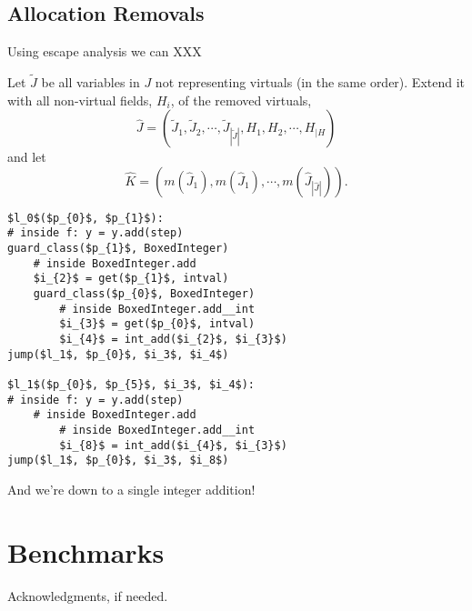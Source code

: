 \documentclass[preprint]{sigplanconf}
\begin{document}
\subsection{Allocation Removals}
Using escape analysis we can XXX

Let $\tilde J$ be all variables in $J$ not representing virtuals (in the
same order). Extend it with all non-virtual fields, $H_i$, of the
removed virtuals,
\begin{equation}
  \hat J = \left(\tilde J_1, \tilde J_2, \cdots, \tilde J_{|\tilde J|}, 
                 H_1, H_2, \cdots, H_{|H}\right)
\end{equation}
and let
\begin{equation}
  \hat K = \left(m\left(\hat J_1\right), m\left(\hat J_1\right), 
                 \cdots, m\left(\hat J_{|\hat J|}\right)\right)
  .
\end{equation}


\begin{lstlisting}[mathescape,numbers = right,basicstyle=\setstretch{1.05}\ttfamily\scriptsize]
$l_0$($p_{0}$, $p_{1}$):
# inside f: y = y.add(step)
guard_class($p_{1}$, BoxedInteger)
    # inside BoxedInteger.add
    $i_{2}$ = get($p_{1}$, intval)
    guard_class($p_{0}$, BoxedInteger)
        # inside BoxedInteger.add__int
        $i_{3}$ = get($p_{0}$, intval)
        $i_{4}$ = int_add($i_{2}$, $i_{3}$)
jump($l_1$, $p_{0}$, $i_3$, $i_4$)

$l_1$($p_{0}$, $p_{5}$, $i_3$, $i_4$):
# inside f: y = y.add(step)
    # inside BoxedInteger.add
        # inside BoxedInteger.add__int
        $i_{8}$ = int_add($i_{4}$, $i_{3}$)
jump($l_1$, $p_{0}$, $i_3$, $i_8$)
\end{lstlisting}

And we're down to a single integer addition!

\section{Benchmarks}



\acks

Acknowledgments, if needed.




\end{document}
